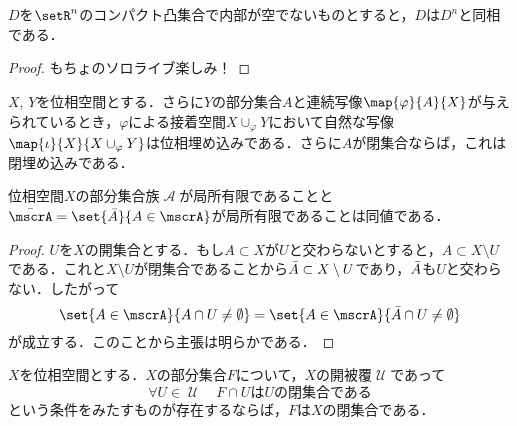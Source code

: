 \documentclass[uplatex]{jsarticle}
\begin{document}


\appendix

\renewcommand{\thetheorem}{\Alph{section}.\arabic{theorem}}

\section{}

\begin{proposition}
  $D$を$\setR^n$のコンパクト凸集合で内部が空でないものとすると，$D$は$D^n$と同相である．
\end{proposition}

\begin{proof}
  もちょのソロライブ楽しみ！
\end{proof}

\begin{proposition}
  $X$, $Y$を位相空間とする．さらに$Y$の部分集合$A$と連続写像$\map{\varphi}{A}{X}$が与えられているとき，$\varphi$による接着空間$X\cup_\varphi Y$において自然な写像$\map{\iota}{X}{X\cup_\varphi Y}$は位相埋め込みである．さらに$A$が閉集合ならば，これは閉埋め込みである．
\end{proposition}

\begin{proposition}\label{locally finite}
  位相空間$X$の部分集合族$\mscrA$が局所有限であることと$\Bar{\mscrA}=\set{\Bar{A}}{A\in \mscrA}$が局所有限であることは同値である．
\end{proposition}

\begin{proof}
  $U$を$X$の開集合とする．もし$A\subset X$が$U$と交わらないとすると，$A\subset X\setminus U$である．これと$X\setminus U$が閉集合であることから$\Bar{A}\subset X\setminus U$であり，$\Bar{A}$も$U$と交わらない．したがって
  \[\set{A\in \mscrA}{A\cap U\neq \emptyset} = \set{A\in \mscrA}{\Bar{A}\cap U \neq \emptyset} \]
  が成立する．このことから主張は明らかである．
\end{proof}

\begin{proposition}\label{closedness local}
  $X$を位相空間とする．$X$の部分集合$F$について，$X$の開被覆$\mscrU$であって
  \[ \forall U\in \mscrU \quad F\cap U\text{は$U$の閉集合である} \]
  という条件をみたすものが存在するならば，$F$は$X$の閉集合である．
\end{proposition}
\end{document}
